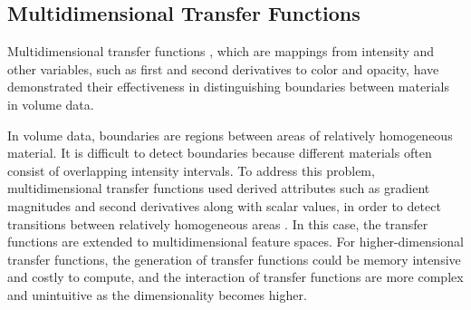 \documentclass{egpubl}
\begin{document}
\subsection{Multidimensional Transfer Functions \label{Multidimensional_Transfer_Functions}}
Multidimensional transfer functions \cite{kniss_interactive_2001}, which are mappings from intensity and other variables, such as first and second derivatives to color and opacity, have demonstrated their effectiveness in distinguishing boundaries between materials in volume data.


In volume data, boundaries are regions between areas of relatively homogeneous material. It is difficult to detect boundaries because different materials often consist of overlapping intensity intervals. To address this problem, multidimensional transfer functions used derived attributes such as gradient magnitudes and second derivatives along with scalar values, in order to detect transitions between relatively homogeneous areas \cite{kindlmann_semi-automatic_1998} \cite{kindlmann_transfer_2002}.
In this case, the transfer functions are extended to multidimensional feature spaces.
For higher-dimensional transfer functions, the generation of transfer functions could be memory intensive and costly to compute, and the interaction of transfer functions are more complex and unintuitive as the dimensionality becomes higher. 
\end{document}
